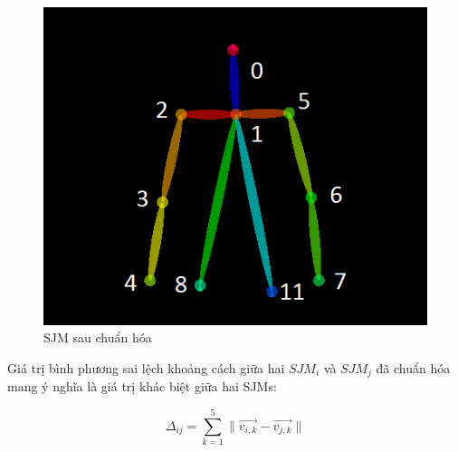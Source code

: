     \begin{figure}[htp]
    \begin{center}
     \includegraphics[scale=0.6]{chap4/c4_figs/joints_choose.png}
    \end{center}
    \caption{SJM sau chuẩn hóa} 
    \label{figure48}
    \end{figure}



Giá trị bình phương sai lệch khoảng cách giữa hai $SJM_i$ và $SJM_j$ đã chuẩn hóa mang ý nghĩa là giá trị khác biệt giữa hai SJMs:

\begin{equation}
{\Delta _{ij}} = \sum\limits_{k = 1}^5 {\parallel \overrightarrow {{v_{i,k}}}  - \overrightarrow {{v_{j,k}}} \parallel } 
\label{equ3.8}
\end{equation}




